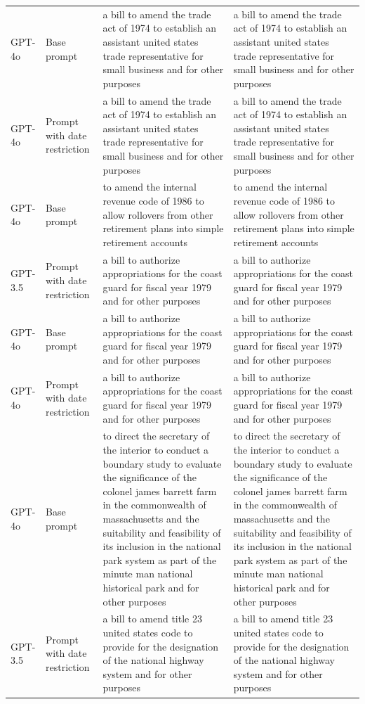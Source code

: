 \begin{longtable}{>{\raggedright\arraybackslash}p{1.4cm}>{\raggedright\arraybackslash}p{1.4cm}>{\raggedright\arraybackslash}p{5.5cm}>{\raggedright\arraybackslash}p{5.5cm}}
GPT-4o & Base prompt & a bill to amend the trade act of 1974 to establish an assistant united states trade representative for small business and for other purposes & a bill to amend the trade act of 1974 to establish an assistant united states trade representative for small business and for other purposes\\
GPT-4o & Prompt with date restriction & a bill to amend the trade act of 1974 to establish an assistant united states trade representative for small business and for other purposes & a bill to amend the trade act of 1974 to establish an assistant united states trade representative for small business and for other purposes\\
GPT-4o & Base prompt & to amend the internal revenue code of 1986 to allow rollovers from other retirement plans into simple retirement accounts & to amend the internal revenue code of 1986 to allow rollovers from other retirement plans into simple retirement accounts\\
GPT-3.5 & Prompt with date restriction & a bill to authorize appropriations for the coast guard for fiscal year 1979 and for other purposes & a bill to authorize appropriations for the coast guard for fiscal year 1979 and for other purposes\\
GPT-4o & Base prompt & a bill to authorize appropriations for the coast guard for fiscal year 1979 and for other purposes & a bill to authorize appropriations for the coast guard for fiscal year 1979 and for other purposes\\
GPT-4o & Prompt with date restriction & a bill to authorize appropriations for the coast guard for fiscal year 1979 and for other purposes & a bill to authorize appropriations for the coast guard for fiscal year 1979 and for other purposes\\
GPT-4o & Base prompt & to direct the secretary of the interior to conduct a boundary study to evaluate the significance of the colonel james barrett farm in the commonwealth of massachusetts and the suitability and feasibility of its inclusion in the national park system as part of the minute man national historical park and for other purposes & to direct the secretary of the interior to conduct a boundary study to evaluate the significance of the colonel james barrett farm in the commonwealth of massachusetts and the suitability and feasibility of its inclusion in the national park system as part of the minute man national historical park and for other purposes\\
GPT-3.5 & Prompt with date restriction & a bill to amend title 23 united states code to provide for the designation of the national highway system and for other purposes & a bill to amend title 23 united states code to provide for the designation of the national highway system and for other purposes\\

\end{longtable}
